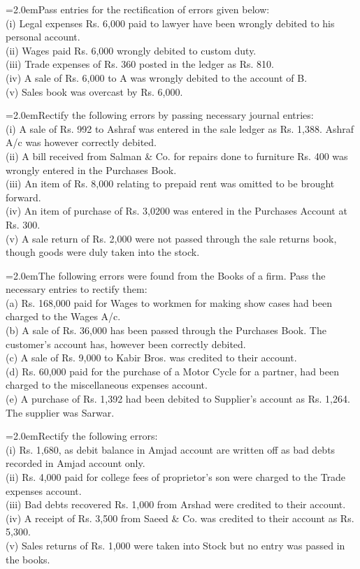 \documentclass[11pt,a4paper]{article}
\newcommand{\lqn}[2]{\Needspace{6\baselineskip}\par\medskip\noindent\hangindent=2.0em\hangafter=1\makebox[2.0em][l]{\textbf{#1.}}#2\par}
\begin{document}
\lqn{141}{Pass entries for the rectification of errors given below:\\
(i) Legal expenses Rs. 6,000 paid to lawyer have been wrongly debited to his personal account.\\
(ii) Wages paid Rs. 6,000 wrongly debited to custom duty.\\
(iii) Trade expenses of Rs. 360 posted in the ledger as Rs. 810.\\
(iv) A sale of Rs. 6,000 to A was wrongly debited to the account of B.\\
(v) Sales book was overcast by Rs. 6,000.\par
}
\lqn{142}{Rectify the following errors by passing necessary journal entries:\\
(i) A sale of Rs. 992 to Ashraf was entered in the sale ledger as Rs. 1,388. Ashraf A/c was however correctly debited.\\
(ii) A bill received from Salman \& Co. for repairs done to furniture Rs. 400 was wrongly entered in the Purchases Book.\\
(iii) An item of Rs. 8,000 relating to prepaid rent was omitted to be brought forward.\\
(iv) An item of purchase of Rs. 3,0200 was entered in the Purchases Account at Rs. 300.\\
(v) A sale return of Rs. 2,000 were not passed through the sale returns book, though goods were duly taken into the stock.\par
}
\lqn{143}{The following errors were found from the Books of a firm. Pass the necessary entries to rectify them:\\
(a) Rs. 168,000 paid for Wages to workmen for making show cases had been charged to the Wages A/c.\\
(b) A sale of Rs. 36,000 has been passed through the Purchases Book. The customer’s account has, however been correctly debited.\\
(c) A sale of Rs. 9,000 to Kabir Bros. was credited to their account.\\
(d) Rs. 60,000 paid for the purchase of a Motor Cycle for a partner, had been charged to the miscellaneous expenses account.\\
(e) A purchase of Rs. 1,392 had been debited to Supplier’s account as Rs. 1,264. The supplier was Sarwar.\par
}
\lqn{144}{Rectify the following errors:\\
(i) Rs. 1,680, as debit balance in Amjad account are written off as bad debts recorded in Amjad account only.\\
(ii) Rs. 4,000 paid for college fees of proprietor’s son were charged to the Trade expenses account.\\
(iii) Bad debts recovered Rs. 1,000 from Arshad were credited to their account.\\
(iv) A receipt of Rs. 3,500 from Saeed \& Co. was credited to their account as Rs. 5,300.\\
(v) Sales returns of Rs. 1,000 were taken into Stock but no entry was passed in the books.\par
}
\end{document}
